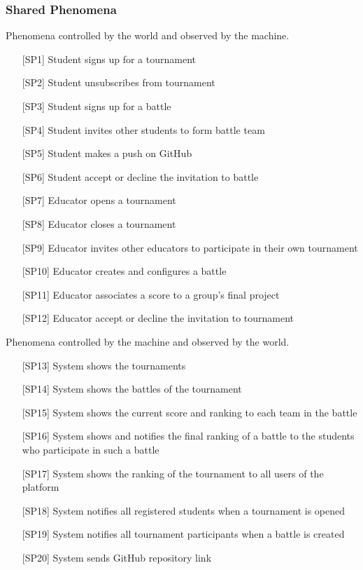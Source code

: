 \vspace{0.5\baselineskip}
\subsubsection{Shared Phenomena}
Phenomena controlled by the world and observed by the machine.
\begin{itemize}[left=20pt]
    \setlength{\itemsep}{0pt}
    \setlength{\parskip}{0pt}
    \setlength{\parsep}{0pt}
    \setlength{\partopsep}{0pt}
    \setlength{\topsep}{0pt}
    \item [{[SP1]}] Student signs up for a tournament
    \item [{[SP2]}] Student unsubscribes from tournament
    \item [{[SP3]}] Student signs up for a battle
    \item [{[SP4]}] Student invites other students to form battle team
    \item [{[SP5]}] Student makes a push on GitHub
    \item [{[SP6]}] Student accept or decline the invitation to battle
    \item [{[SP7]}] Educator opens a tournament
    \item [{[SP8]}] Educator closes a tournament
    \item [{[SP9]}] Educator invites other educators to participate in their own tournament
    \item [{[SP10]}] Educator creates and configures a battle
    \item [{[SP11]}] Educator associates a score to a group's final project
    \item [{[SP12]}] Educator accept or decline the invitation to tournament
\end{itemize}

\begin{flushleft}
Phenomena controlled by the machine and observed by the world.
\begin{itemize}[left=20pt]
    \setlength{\itemsep}{0pt}
    \setlength{\parskip}{0pt}
    \setlength{\parsep}{0pt}
    \setlength{\partopsep}{0pt}
    \setlength{\topsep}{0pt}
    \item [{[SP13]}] System shows the tournaments 
    \item [{[SP14]}] System shows the battles of the tournament
    \item [{[SP15]}] System shows the current score and ranking to each team in the battle
    \item [{[SP16]}] System shows and notifies the final ranking of a battle to the students who participate in such a battle
    \item [{[SP17]}] System shows the ranking of the tournament to all users of the platform
    \item [{[SP18]}] System notifies all registered students when a tournament is opened
    \item [{[SP19]}] System notifies all tournament participants when a battle is created
    \item [{[SP20]}] System sends GitHub repository link
\end{itemize}
\end{flushleft}


